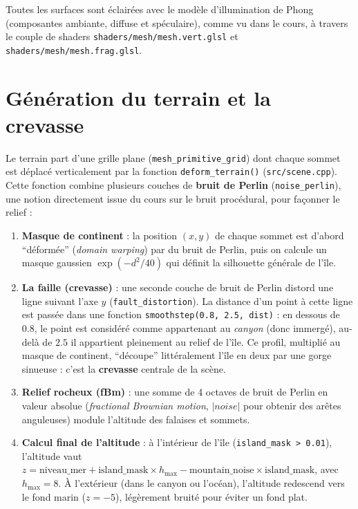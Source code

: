 \documentclass[11pt,a4paper]{article}
\begin{document}
Toutes les surfaces sont éclairées avec le modèle d'illumination de
Phong (composantes ambiante, diffuse et spéculaire), comme vu dans le
cours, à travers le couple de shaders
\texttt{shaders/mesh/mesh.vert.glsl} et
\texttt{shaders/mesh/mesh.frag.glsl}.

\section{Génération du terrain et la crevasse}
\label{sec:crevasse}

Le terrain part d'une grille plane (\texttt{mesh\_primitive\_grid})
dont chaque sommet est déplacé verticalement par la fonction
\texttt{deform\_terrain()} (\texttt{src/scene.cpp}). Cette fonction
combine plusieurs couches de \textbf{bruit de Perlin}
(\texttt{noise\_perlin}), une notion directement issue du cours sur le
bruit procédural, pour façonner le relief :

\begin{enumerate}
    \item \textbf{Masque de continent} : la position $(x,y)$ de chaque
    sommet est d'abord ``déformée'' (\emph{domain warping}) par du bruit
    de Perlin, puis on calcule un masque gaussien
    $\exp(-d^2/40)$ qui définit la silhouette générale de l'île.
    \item \textbf{La faille (crevasse)} : une seconde couche de bruit de
    Perlin distord une ligne suivant l'axe $y$
    (\texttt{fault\_distortion}). La distance d'un point à cette ligne
    est passée dans une fonction \texttt{smoothstep(0.8, 2.5, dist)} :
    en dessous de $0.8$, le point est considéré comme appartenant au
    \emph{canyon} (donc immergé), au-delà de $2.5$ il appartient
    pleinement au relief de l'île. Ce profil, multiplié au masque de
    continent, ``découpe'' littéralement l'île en deux par une gorge
    sinueuse : c'est la \textbf{crevasse} centrale de la scène.
    \item \textbf{Relief rocheux (fBm)} : une somme de 4 octaves de
    bruit de Perlin en valeur absolue (\emph{fractional Brownian
    motion}, $|noise|$ pour obtenir des arêtes anguleuses) module
    l'altitude des falaises et sommets.
    \item \textbf{Calcul final de l'altitude} : à l'intérieur de l'île
    (\texttt{island\_mask > 0.01}), l'altitude vaut
    $z = \text{niveau\_mer} + \text{island\_mask}\times h_{\max} -
    \text{mountain\_noise}\times \text{island\_mask}$, avec
    $h_{\max}=8$. À l'extérieur (dans le canyon ou l'océan), l'altitude
    redescend vers le fond marin ($z=-5$), légèrement bruité pour éviter
    un fond plat.
\end{enumerate}
\end{document}
